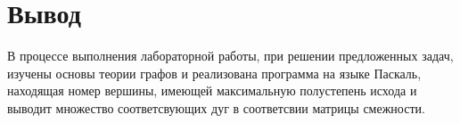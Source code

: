 \documentclass[a4paper,14pt]{extarticle}
\begin{document}
  \section*{\hspace{12.5mm}Вывод}
  В процессе выполнения лабораторной работы, при решении предложенных задач, изучены основы теории графов и реализована программа на языке Паскаль, находящая номер вершины, имеющей максимальную полустепень исхода и выводит множество соответсвующих дуг в соответсвии матрицы смежности.
\end{document}
